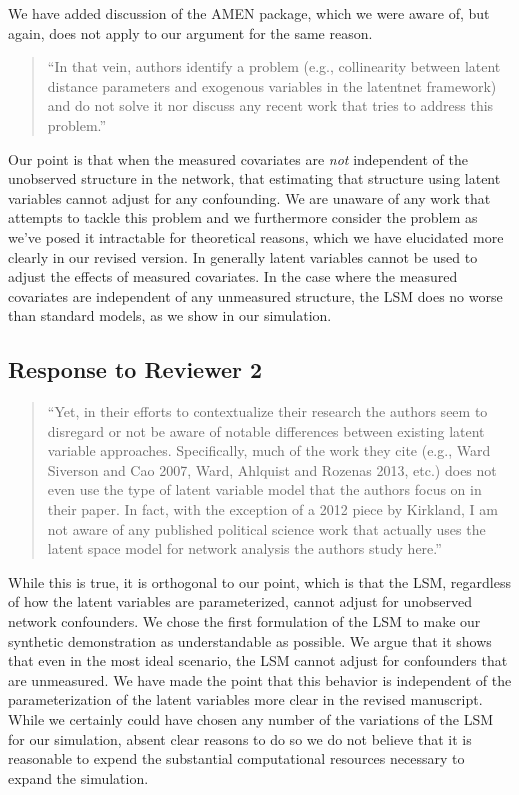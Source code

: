 We have added discussion of the AMEN package, which we were aware of,
but again, does not apply to our argument for the same reason.

\begin{quote}
``In that vein, authors identify a problem (e.g., collinearity between
latent distance parameters and exogenous variables in the latentnet
framework) and do not solve it nor discuss any recent work that tries to
address this problem.''
\end{quote}

Our point is that when the measured covariates are \emph{not}
independent of the unobserved structure in the network, that estimating
that structure using latent variables cannot adjust for any confounding.
We are unaware of any work that attempts to tackle this problem and we
furthermore consider the problem as we've posed it intractable for
theoretical reasons, which we have elucidated more clearly in our
revised version. In generally latent variables cannot be used to adjust
the effects of measured covariates. In the case where the measured
covariates are independent of any unmeasured structure, the LSM does no
worse than standard models, as we show in our simulation.

\subsection{Response to Reviewer 2}\label{response-to-reviewer-2}

\begin{quote}
``Yet, in their efforts to contextualize their research the authors seem
to disregard or not be aware of notable differences between existing
latent variable approaches. Specifically, much of the work they cite
(e.g., Ward Siverson and Cao 2007, Ward, Ahlquist and Rozenas 2013,
etc.) does not even use the type of latent variable model that the
authors focus on in their paper. In fact, with the exception of a 2012
piece by Kirkland, I am not aware of any published political science
work that actually uses the latent space model for network analysis the
authors study here.''
\end{quote}

While this is true, it is orthogonal to our point, which is that the
LSM, regardless of how the latent variables are parameterized, cannot
adjust for unobserved network confounders. We chose the first
formulation of the LSM to make our synthetic demonstration as
understandable as possible. We argue that it shows that even in the most
ideal scenario, the LSM cannot adjust for confounders that are
unmeasured. We have made the point that this behavior is independent of
the parameterization of the latent variables more clear in the revised
manuscript. While we certainly could have chosen any number of the
variations of the LSM for our simulation, absent clear reasons to do so
we do not believe that it is reasonable to expend the substantial
computational resources necessary to expand the simulation.

